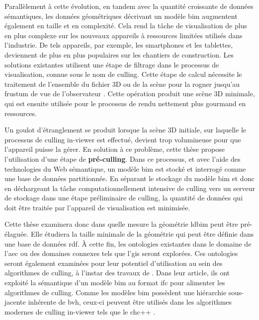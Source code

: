 \begin{refsection}
\begin{multicols}{2}
        Parallèlement à cette évolution, en tandem avec la quantité croissante de données sémantiques, les données géométriques décrivant un modèle \ac{bim} augmentent également en taille et en complexité. Cela rend la tâche de visualisation de plus en plus complexe sur les nouveaux appareils à ressources limitées utilisés dans l'industrie. De tels appareils, par exemple, les smartphones et les tablettes, deviennent de plus en plus populaires sur les chantiers de construction. Les solutions existantes utilisent une étape de filtrage dans le processus de visualisation, connue sous le nom de culling. Cette étape de calcul nécessite le traitement de l'ensemble du fichier 3D ou de la scène pour la rogner jusqu'au frustum de vue de l'observateur \parencite{Johansson2015}. Cette opération produit une scène 3D minimale, qui est ensuite utilisée pour le processus de rendu nettement plus gourmand en ressources.

        Un goulot d'étranglement se produit lorsque la scène 3D initiale, sur laquelle le processus de culling in-viewer est effectué, devient trop volumineuse pour que l'appareil puisse la gérer. En solution à ce problème, cette thèse propose l'utilisation d'une étape de \textbf{pré-culling}. Dans ce processus, et avec l'aide des technologies du Web sémantique, un modèle \ac{bim} est stocké et interrogé comme une base de données partitionnée. En séparant le stockage du modèle \ac{bim} et donc en déchargeant la tâche computationnellement intensive de culling vers un serveur de stockage dans une étape préliminaire de culling, la quantité de données qui doit être traitée par l'appareil de visualisation est minimisée.

        Cette thèse examinera donc dans quelle mesure la géométrie \ac{ldbim} peut être pré-élaguée. Elle étudiera la taille minimale de la géométrie qui peut être définie dans une base de données \ac{rdf}. À cette fin, les ontologies existantes dans le domaine de l'\ac{aec} ou des domaines connexes tels que l'\ac{gis} seront explorées. Ces ontologies seront également examinées pour leur potentiel d'utilisation au sein des algorithmes de culling, à l'instar des travaux de \cite{Johansson2009}. Dans leur article, ils ont exploité la sémantique d'un modèle \ac{bim} au format \ac{ifc} pour alimenter les algorithmes de culling. Comme les modèles \ac{bim} possèdent une hiérarchie sous-jacente inhérente de \ac{bvh}, ceux-ci peuvent être utilisés dans les algorithmes modernes de culling in-viewer tels que le \ac{chc}++ \parencite{Johansson2015}.


\end{multicols}
\end{refsection}
